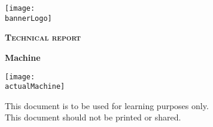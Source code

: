 \begin{titlepage}
    \centering
    \texttt{[image: \\bannerLogo]}\par\vspace{1cm}
    {\scshape\LARGE \textbf{Technical report}}\par\vspace{0.3cm}
    {\Huge \bfseries \textcolor{greenBanner}{Machine \machineName}}\par\vspace{1cm}
    \vfill
    \vfill
    \texttt{[image: \\actualMachine]}\par\vspace{1cm}
    \vfill
    \begin{tcolorbox}[colback=red!5!white,colframe=red!75!black]
        \centering
        This document is to be used for learning purposes only.\\
        This document should not be printed or shared.
    \end{tcolorbox}
    \vfill
    {\large \startDate}\par
    \vfill
    \clearpage
\end{titlepage}